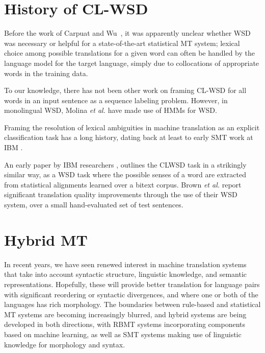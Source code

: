\section{History of CL-WSD}
Before the work of Carpuat and Wu~\cite{improvingsmtwsd}, it was apparently
unclear whether WSD was necessary or helpful for a state-of-the-art statistical
MT system; lexical choice among possible translations for a given word can
often be handled by the language model for the target language, simply due to
collocations of appropriate words in the training data.




To our knowledge, there has not been other work on framing CL-WSD for all words
in an input sentence as a sequence labeling problem. However, in monolingual
WSD, Molina \textit{et al.} \cite{DBLP:conf/iberamia/MolinaPS02} have made
use of HMMs for WSD. 


Framing the resolution of lexical ambiguities in machine translation
as an explicit classification
task has a long history, dating back at least to early SMT work at IBM
\cite{Brown91word-sensedisambiguation}.

An early paper by IBM researchers \cite{Brown91word-sensedisambiguation},
outlines the CLWSD task in a strikingly similar way, as a WSD task where the
possible senses of a word are extracted from statistical alignments learned
over a bitext corpus. Brown \textit{et al.} report significant translation
quality improvements through the use of their WSD system, over a small
hand-evaluated set of test sentences.







\section{Hybrid MT}

In recent years, we have seen renewed interest in machine translation systems
that take into account syntactic structure, linguistic knowledge, and semantic
representations.
Hopefully, these will provide better translation for language pairs with
significant reordering or syntactic divergences, and where one or both of the
languages has rich morphology.
The boundaries between rule-based and statistical MT systems are becoming
increasingly blurred, and hybrid systems are being developed in both
directions, with RBMT systems incorporating components based on machine
learning, as well as SMT systems making use of linguistic knowledge for
morphology and syntax.

